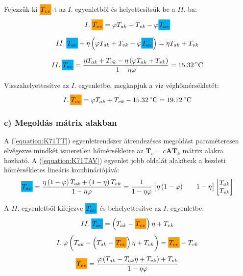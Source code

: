 Fejezzük ki $\highlight{orange!75!yellow}{T_{vv}}$-t az $I.$ egyenletből és helyettesítsük be a $II.$-ba:
\begin{equation}
	\label{equation:K71TVV}
	I.\: \highlight{orange!75!yellow}{T_{vv}} = \varphi T_{ak} + T_{vk} - \varphi \highlight{cyan}{T_{av}} 
\end{equation}

\begin{equation}
	II.\: \highlight{cyan}{T_{av}} + \eta \left(\varphi T_{ak} + T_{vk} - \varphi \highlight{cyan}{T_{av}}\right) = \eta T_{ak} + T_{vk}
\end{equation}

\begin{equation}
	\label{equation:K71TAV}
	II.\: \highlight{cyan}{T_{av}} = \dfrac{
		\eta T_{ak} + T_{vk} - \eta \left(\varphi T_{ak} + T_{vk}\right)
		}{
		1-\eta \varphi
		}
	= 
	\SI{15.32}{\celsius}
\end{equation}

Visszahelyettesítve az $I.$ egyenletbe, megkapjuk a víz véghőmérsékletét:
\begin{equation}
	I.\: \highlight{orange!75!yellow}{T_{vv}} = \varphi T_{ak} + T_{vk} - \SI{15.32}{\celsius} =  \SI{19.72}{\celsius} 
\end{equation}


\subsubsection*{c) Megoldás mátrix alakban}
A (\ref{equation:K71TT}) egyenletrendszer átrendezéses megoldást paraméteresen elvégezve mindkét ismeretlen hőmérsékletre az $\mathbf{T}_v = c\mathbf{A}\mathbf{T}_k$ mátrix alakra hozható. A (\ref{equation:K71TAV}) egyenlet jobb oldalát alakítsuk a kezdeti hőmérsékletes lineáris kombinációjává:
\begin{equation}
	\highlight{cyan}{T_{av}} = \dfrac{
		\eta \left( 1 - \varphi \right) T_{ak} + \left( 1 - \eta \right) T_{vk}
	}{
		1-\eta \varphi
	}
	=
	\dfrac{1}{1-\eta \varphi}
	\begin{bmatrix}
		\eta \left( 1 - \varphi \right) && 1 - \eta
	\end{bmatrix}
	\begin{bmatrix}
		T_{ak} \\
		T_{vk}
	\end{bmatrix}
\end{equation}

A $II.$ egyenletből kifejezve $\highlight{cyan}{T_{av}}$ és behelyettesítve az $I.$ egyenletbe:
\begin{equation}
	II.\: \highlight{cyan}{T_{av}} = \left(T_{ak} - \highlight{orange!75!yellow}{T_{vv}}\right) \eta + T_{vk}
\end{equation}
\begin{equation}
	I.\: \varphi \left( T_{ak} - \left(T_{ak} - \highlight{orange!75!yellow}{T_{vv}}\right) \eta + T_{vk} \right) 
	= 
	\highlight{orange!75!yellow}{T_{vv}} - T_{vk} 
\end{equation}
\begin{equation}
	\highlight{orange!75!yellow}{T_{vv}}
	=
	\dfrac{
		\varphi \left( T_{ak} - T_{ak} \eta + T_{vk} \right) + T_{vk}
	}{
		1 - \eta \varphi
	}
\end{equation}

